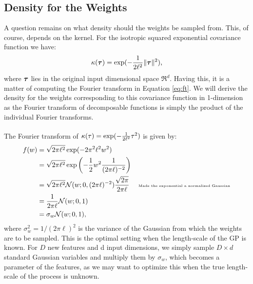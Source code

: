 \documentclass[11pt,a4paper]{article}
\renewcommand{\t}{\vecS{\tau}}
\renewcommand{\t}{\vecS{\tau}}
\newcommand{\sigmaw}{\sigma_w}
\begin{document}
\subsection{Density for the Weights}
A question remains on what density should the weights be sampled from. This, of course, depends on the kernel. 
For the isotropic squared exponential covariance function we have:
\begin{align}
	\kernel(\t) = \exp(- \frac{1}{2 \ell^2} \norm{\t}^2 ) \text{,}
\end{align}
where $\t$ lies in the original input dimensional space $\Re^d$. Having this, it is a matter of computing 
the Fourier transform in Equation \eqref{eq:ft}.
We will derive the density for the weights corresponding to this covariance function in 1-dimension as 
the Fourier transform of decomposable functions is simply the product of the individual Fourier transforms. \\ \\

The Fourier transform of $\kappa(\tau) = \exp(- \frac{1}{2 \ell^2} \tau^2) $ is given by:
\begin{align}
	f(w) & = \sqrt{2 \pi \ell^2} \exp( - 2 \pi^2 \ell^2 w^2) \\
	&= \sqrt{2 \pi \ell^2}  \exp\left( - \frac{1}{2} w^2 \frac{1}{(2 \pi \ell)^{-2}} \right) \\
	&= \sqrt{2 \pi \ell^2} \Normal(w;0, (2 \pi \ell)^{-2}) \frac{\sqrt{2 \pi}}{2 \pi \ell} \quad \text{ \tiny Made the exponential 
	a normalized Gaussian} \\
	&= \frac{1}{2\pi \ell} \Normal(w; 0, 1) \\
	& = \sigmaw \Normal(w; 0, 1) \text{,}
\end{align}
where $\sigmaw^2 = {1}/{(2\pi \ell)^2}$ is the variance of the Gaussian from which the weights are to be sampled.
This is the optimal setting when the length-scale of the GP is known. 
For $D$ new features and d input dimensions, we simply sample $D \times d$ standard Gaussian variables and
 multiply them by $\sigmaw$, which becomes a parameter of the features, as we may want to optimize 
 this when the true length-scale of the process is unknown.
\end{document}
